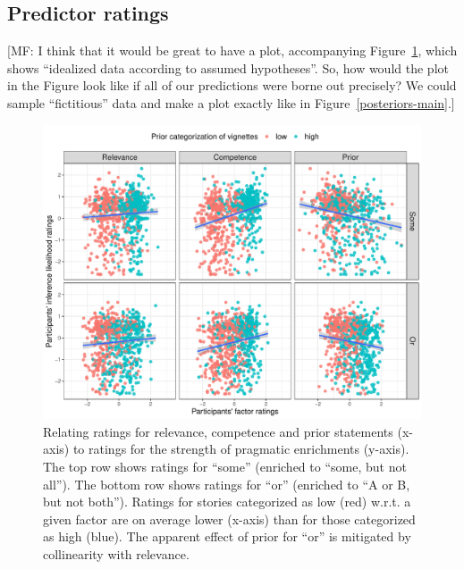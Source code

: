 \documentclass{sp}
\newcommand{\mf}[1]{\textcolor{BurntOrange}{[MF: #1]}}
\begin{document}
\subsection{Predictor ratings}

\mf{I think that it would be great to have a plot, accompanying Figure~\ref{main-raw-ratings}, which shows ``idealized data according to assumed hypotheses''. So, how would the plot in the Figure look like if all of our predictions were borne out precisely? We could sample ``fictitious'' data and make a plot exactly like in Figure~\ref{posteriors-main}.}

\begin{figure}[h]
	\begin{center}
		\includegraphics[width=1\linewidth]{images/byFactor-byPrior-raw-scatter.pdf}
	\end{center}
	\vspace{-0.3cm}
	\caption{Relating ratings for relevance, competence and prior statements (x-axis) to ratings for the strength of pragmatic enrichments (y-axis). The top row shows ratings for “some” (enriched to “some, but not all”). The bottom row shows ratings for “or” (enriched to “A or B, but not both”). Ratings for stories categorized as low (red) w.r.t. a given factor are on average lower (x-axis) than for those categorized as high (blue). The apparent effect of prior for “or” is mitigated by collinearity with relevance.}
	\label{main-raw-ratings}
\end{figure}
\end{document}
